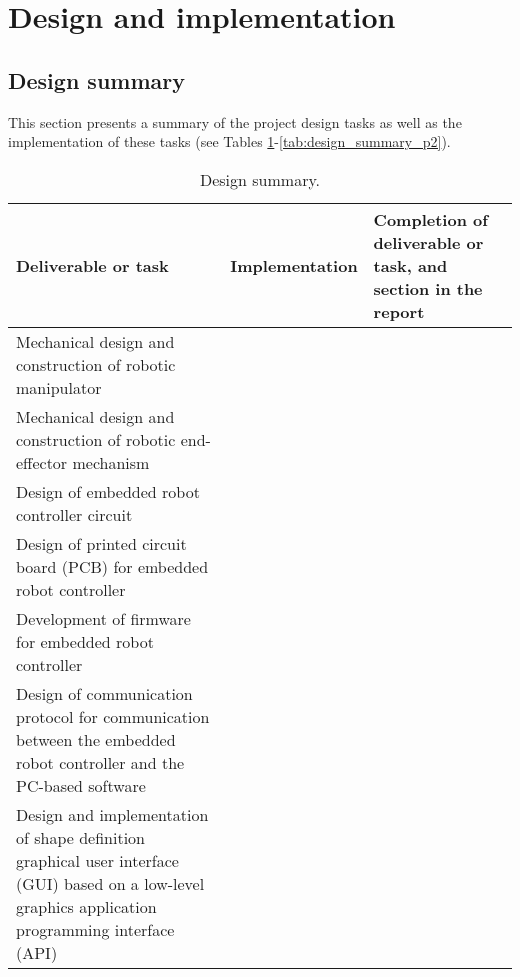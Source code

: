 
\section{Design and implementation}


\subsection{Design summary}

This section presents a summary of the project design tasks as well as the implementation of these tasks (see Tables \ref{tab:design_summary_p1}-\ref{tab:design_summary_p2}).

\begin{table}[ht]
	\renewcommand{\arraystretch}{1.3}
	\centering
	\begin{tabular}{|>{\raggedright}m{5cm}|>{\raggedright}m{5cm}|>{\raggedright\arraybackslash}m{5cm}|}
		\hline
		\textbf{Deliverable or task} & \textbf{Implementation} & \textbf{Completion of deliverable or task, and section in the report} \\
		\hline
		Mechanical design and construction of robotic manipulator & & \\
		\hline
		Mechanical design and construction of robotic end-effector mechanism & & \\
		\hline
		Design of embedded robot controller circuit & & \\
		\hline
		Design of printed circuit board (PCB) for embedded robot controller & & \\
		\hline
		Development of firmware for embedded robot controller & & \\
		\hline
		Design of communication protocol for communication between the embedded robot controller and the PC-based software & & \\
		\hline
		Design and implementation of shape definition graphical user interface (GUI) based on a low-level graphics application programming interface (API) & & \\
		\hline
	\end{tabular}
	\caption{\label{tab:design_summary_p1}Design summary.}
\end{table}

